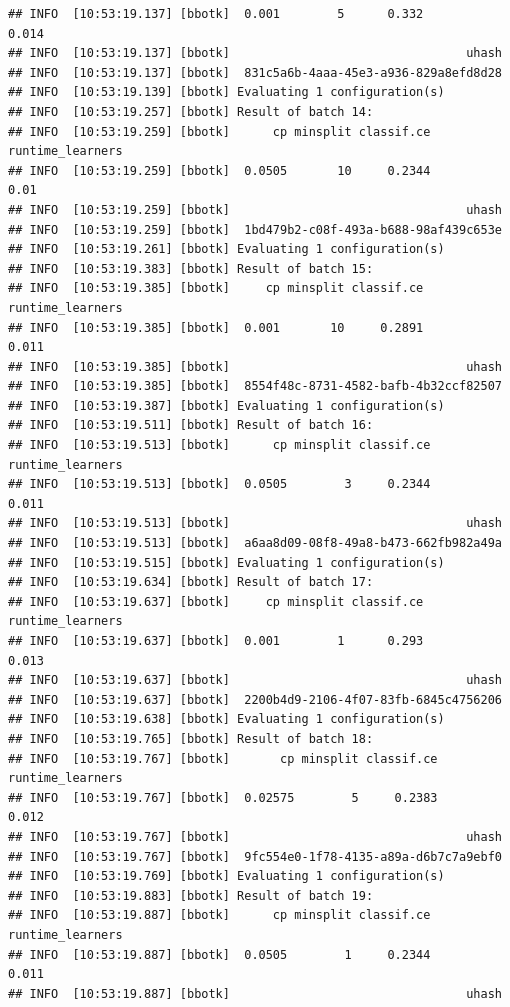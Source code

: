 \documentclass[
]{scrbook}
\begin{document}
\begin{verbatim}
## INFO  [10:53:19.137] [bbotk]  0.001        5      0.332            0.014 
## INFO  [10:53:19.137] [bbotk]                                 uhash 
## INFO  [10:53:19.137] [bbotk]  831c5a6b-4aaa-45e3-a936-829a8efd8d28 
## INFO  [10:53:19.139] [bbotk] Evaluating 1 configuration(s) 
## INFO  [10:53:19.257] [bbotk] Result of batch 14: 
## INFO  [10:53:19.259] [bbotk]      cp minsplit classif.ce runtime_learners 
## INFO  [10:53:19.259] [bbotk]  0.0505       10     0.2344             0.01 
## INFO  [10:53:19.259] [bbotk]                                 uhash 
## INFO  [10:53:19.259] [bbotk]  1bd479b2-c08f-493a-b688-98af439c653e 
## INFO  [10:53:19.261] [bbotk] Evaluating 1 configuration(s) 
## INFO  [10:53:19.383] [bbotk] Result of batch 15: 
## INFO  [10:53:19.385] [bbotk]     cp minsplit classif.ce runtime_learners 
## INFO  [10:53:19.385] [bbotk]  0.001       10     0.2891            0.011 
## INFO  [10:53:19.385] [bbotk]                                 uhash 
## INFO  [10:53:19.385] [bbotk]  8554f48c-8731-4582-bafb-4b32ccf82507 
## INFO  [10:53:19.387] [bbotk] Evaluating 1 configuration(s) 
## INFO  [10:53:19.511] [bbotk] Result of batch 16: 
## INFO  [10:53:19.513] [bbotk]      cp minsplit classif.ce runtime_learners 
## INFO  [10:53:19.513] [bbotk]  0.0505        3     0.2344            0.011 
## INFO  [10:53:19.513] [bbotk]                                 uhash 
## INFO  [10:53:19.513] [bbotk]  a6aa8d09-08f8-49a8-b473-662fb982a49a 
## INFO  [10:53:19.515] [bbotk] Evaluating 1 configuration(s) 
## INFO  [10:53:19.634] [bbotk] Result of batch 17: 
## INFO  [10:53:19.637] [bbotk]     cp minsplit classif.ce runtime_learners 
## INFO  [10:53:19.637] [bbotk]  0.001        1      0.293            0.013 
## INFO  [10:53:19.637] [bbotk]                                 uhash 
## INFO  [10:53:19.637] [bbotk]  2200b4d9-2106-4f07-83fb-6845c4756206 
## INFO  [10:53:19.638] [bbotk] Evaluating 1 configuration(s) 
## INFO  [10:53:19.765] [bbotk] Result of batch 18: 
## INFO  [10:53:19.767] [bbotk]       cp minsplit classif.ce runtime_learners 
## INFO  [10:53:19.767] [bbotk]  0.02575        5     0.2383            0.012 
## INFO  [10:53:19.767] [bbotk]                                 uhash 
## INFO  [10:53:19.767] [bbotk]  9fc554e0-1f78-4135-a89a-d6b7c7a9ebf0 
## INFO  [10:53:19.769] [bbotk] Evaluating 1 configuration(s) 
## INFO  [10:53:19.883] [bbotk] Result of batch 19: 
## INFO  [10:53:19.887] [bbotk]      cp minsplit classif.ce runtime_learners 
## INFO  [10:53:19.887] [bbotk]  0.0505        1     0.2344            0.011 
## INFO  [10:53:19.887] [bbotk]                                 uhash 

\end{verbatim}
\end{document}
